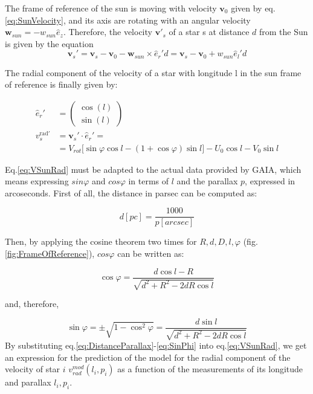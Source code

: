 \noindent
The frame of reference of the sun is moving with velocity $\bm{v}_0$ given by eq.\ref{eq:SunVelocity}, and its axis are rotating with an angular velocity $\bm{w}_{sun} = -w_{sun} \hat{e}_z$. Therefore, the velocity $\bm{v'}_s$ of a star s at distance $d$ from the Sun is given by the equation
\begin{equation}\label{eq:ReferenceFrame}
    \bm{v}_s' = \bm{v}_s - \bm{v}_0 - \bm{w}_{sun} \times \hat{e}_r' d = \bm{v}_s - \bm{v}_0 + w_{sun} \hat{e}_l' d
\end{equation}
\noindent 


\noindent 
The radial component of the velocity of a star with longitude l in the sun frame of reference is finally given by:

\begin{equation}\label{eq:VSunRad}
    \begin{aligned}
        \hat{e}_r' &= \begin{pmatrix} \cos(l) \\ \sin(l) \end{pmatrix} \\
        v_s^{\text{rad}'}  &= \bm{v}_s' \cdot \hat{e}_r' = \\ 
        &=V_{rot} \biggl[ \sin\varphi \cos l - (1 + \cos\varphi)\sin l \biggr] - U_0 \cos l - V_0 \sin l
    \end{aligned}
\end{equation}
\noindent




Eq.\ref{eq:VSunRad} must be adapted to the actual data provided by GAIA, which means expressing $sin\varphi$ and $cos\varphi$ in terms of $l$ and the parallax $p$, expressed in arcoseconds. First of all, the distance in parsec can be computed as:

\begin{equation}\label{eq:DistanceParallax}
    d[pc] = \frac{1000}{p[arcsec]}
\end{equation}

\noindent
Then, by applying the cosine theorem two times for $R, d, D, l, \varphi$ (fig.\ref{fig:FrameOfReference}), $cos\varphi$ can be written as:

\begin{equation}\label{eq:CosPhi}
    \cos\varphi = \frac{d \cos l - R}{\sqrt{d^2 + R^2 - 2dR \cos l}}
\end{equation}

\noindent
and, therefore,

\begin{equation}\label{eq:SinPhi}
    \sin\varphi = \pm \sqrt{1 - \cos^2 \varphi} = \frac{d\sin l}{\sqrt{d^2 + R^2 -2dR \cos l}}
\end{equation}
\noindent
By substituting eq.\ref{eq:DistanceParallax}-\ref{eq:SinPhi} into eq.\ref{eq:VSunRad}, we get an expression for the prediction of the model for the radial component of the velocity of star $i$ $v_{rad}^{mod}(l_i, p_i)$ as a function of the measurements of its longitude and parallax $l_i, p_i$.
